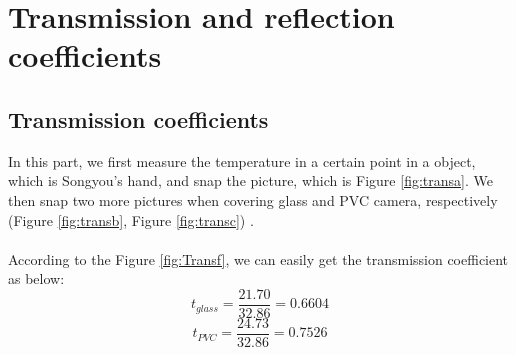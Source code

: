 \documentclass[english]{article}
\begin{document}

\section{Transmission and reflection coefficients}
\subsection{Transmission coefficients}
In this part, we first measure the temperature in a certain point in a object, which is Songyou's hand, and snap the picture, which is Figure \ref{fig:transa}.
We then snap two more pictures when covering glass and PVC  camera, respectively (Figure \ref{fig:transb}, Figure \ref{fig:transc}) .\\
\\
According to the Figure \ref{fig:Transf}, we can easily get the transmission coefficient as below:
$$
t_{glass} = \frac{21.70}{32.86} = 0.6604
$$
$$
t_{PVC} = \frac{24.73}{32.86} = 0.7526
$$
\end{document}
